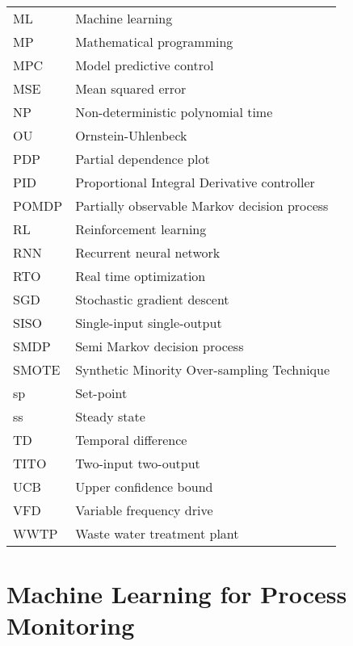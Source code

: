 \documentclass[12pt]{report}
\begin{document}
\newpage
\begin{tabular}{@{}ll}
ML & Machine learning \\
MP & Mathematical programming \\
MPC & Model predictive control \\
MSE & Mean squared error \\
NP & Non-deterministic polynomial time \\
OU & Ornstein-Uhlenbeck \\
PDP & Partial dependence plot \\
PID & Proportional Integral Derivative controller \\
POMDP & Partially observable Markov decision process \\
RL & Reinforcement learning \\
RNN & Recurrent neural network \\
RTO & Real time optimization \\
SGD & Stochastic gradient descent \\
SISO & Single-input single-output \\
SMDP & Semi Markov decision process \\
SMOTE & Synthetic Minority Over-sampling Technique \\
sp & Set-point \\
ss & Steady state \\
TD & Temporal difference \\
TITO & Two-input two-output \\
UCB & Upper confidence bound \\
VFD & Variable frequency drive \\
WWTP & Waste water treatment plant \\
\end{tabular}

% 

% 

\chapter{Machine Learning for Process Monitoring}

\end{document}
